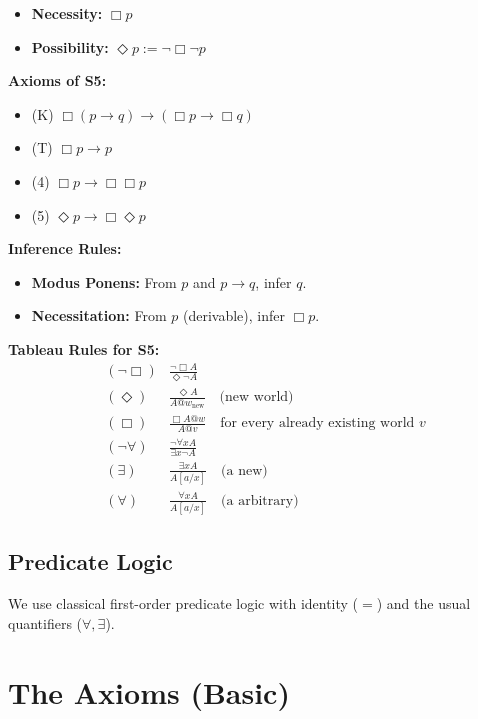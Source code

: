 \documentclass[
]{article}
\begin{document}
\begin{itemize}
\item \textbf{Necessity:} \(\Box p\)
\item \textbf{Possibility:} \(\Diamond p := \neg\Box\neg p\)
\end{itemize}

\textbf{Axioms of S5:}
\begin{itemize}
\item (K) \(\Box(p \rightarrow q) \rightarrow (\Box p \rightarrow \Box q)\)
\item (T) \(\Box p \rightarrow p\)
\item (4) \(\Box p \rightarrow \Box\Box p\)
\item (5) \(\Diamond p \rightarrow \Box\Diamond p\)
\end{itemize}

\textbf{Inference Rules:}
\begin{itemize}
\item \textbf{Modus Ponens:} From \(p\) and \(p \rightarrow q\), infer \(q\).
\item \textbf{Necessitation:} From \(p\) (derivable), infer \(\Box p\).
\end{itemize}

\textbf{Tableau Rules for S5:}
\begin{align*}
& (\neg\Box) & \frac{\neg\Box A}{\Diamond\neg A} \\
& (\Diamond) & \frac{\Diamond A}{A @ w_{\text{new}}} \quad \text{(new world)} \\
& (\Box) & \frac{\Box A @ w}{A @ v} \quad \text{for every already existing world } v \\
& (\neg\forall) & \frac{\neg\forall x A}{\exists x \neg A} \\
& (\exists) & \frac{\exists x A}{A[a/x]} \quad \text{(a new)} \\
& (\forall) & \frac{\forall x A}{A[a/x]} \quad \text{(a arbitrary)}
\end{align*}

\subsection{Predicate Logic}

We use classical first-order predicate logic with identity (\(=\)) and the usual quantifiers (\(\forall, \exists\)).

\section{The Axioms (Basic)}
\end{document}
